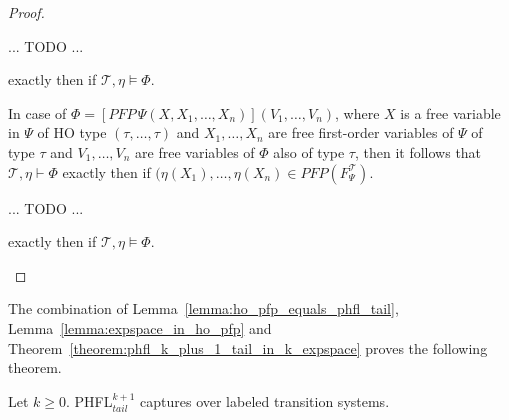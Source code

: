 \begin{proof}
\begin{compactitem}
        ...
        TODO
        ...
        
        exactly then if $\mathcal{T}, \eta \models \Phi$.

        \item In case of $\Phi = [PFP\,\Psi(X, X_1, \dots, X_n)](V_1, \dots, V_n)$, where $X$ is a
        free variable in $\Psi$ of HO type $(\tau, \dots, \tau)$ and $X_1, \dots, X_n$ are free first-order
        variables of $\Psi$ of type $\tau$ and $V_1, \dots, V_n$ are free variables of $\Phi$ also of type $\tau$, then
        it follows that $\mathcal{T}, \eta \vdash \Phi$ exactly then if $(\eta(X_1), \dots, \eta(X_n) \in PFP
        (F_\Psi^\mathcal{T})$. 
        
...
TODO
...        
        
        exactly then if $\mathcal{T}, \eta \models \Phi$.
    \end{compactitem}
\end{proof}

The combination of Lemma~\ref{lemma:ho_pfp_equals_phfl_tail}, Lemma~\ref{lemma:expspace_in_ho_pfp} and
Theorem~\ref{theorem:phfl_k_plus_1_tail_in_k_expspace} proves the following theorem.

\begin{theorem}
    Let $k \geq 0$. PHFL$^{k+1}_{tail}$ captures  over labeled transition systems.
\end{theorem}